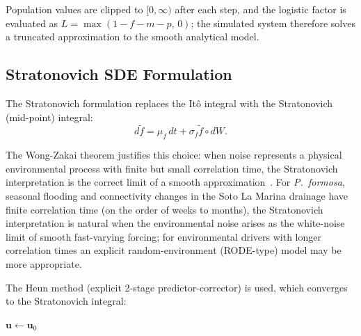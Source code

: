 \documentclass[12pt]{article}
\begin{document}
Population values are clipped to $[0, \infty)$ after each step, and the
logistic factor is evaluated as $L = \max(1 - f - m - p,\, 0)$; the
simulated system therefore solves a truncated approximation to the smooth
analytical model.


\subsection{Stratonovich SDE Formulation}
The Stratonovich formulation replaces the It\^{o} integral with the Stratonovich (mid-point) integral:
\begin{equation}
  d\tilde{f} = \mu_f\,dt + \sigma_f \tilde{f} \circ dW.
\end{equation}

The Wong-Zakai theorem justifies this choice: when noise represents a physical environmental process with finite but small correlation time, the Stratonovich interpretation is the correct limit of a smooth approximation~\citep{Oksendal2003}.  For \textit{P.~formosa}, seasonal flooding and connectivity changes in the Soto La Marina drainage have finite correlation time (on the order of weeks to months), the Stratonovich interpretation is natural when the environmental noise
arises as the white-noise limit of smooth fast-varying forcing; for
environmental drivers with longer correlation times an explicit
random-environment (RODE-type) model may be more appropriate.

The Heun method (explicit 2-stage predictor-corrector) is used, which converges to the Stratonovich integral:

\begin{algorithm}[H]
\DontPrintSemicolon
\SetAlgoLined
{}
$\mathbf{u} \leftarrow \mathbf{u}_0$\;
\caption{Heun method (Stratonovich SDE)}
\label{alg:Heun}
\end{algorithm}
\end{document}
